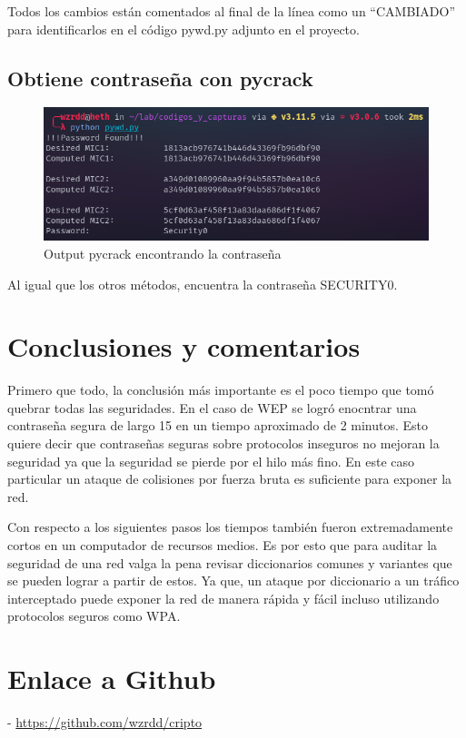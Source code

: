 \documentclass[letter,12pt]{article}
\begin{document}
Todos los cambios están comentados al final de la línea como un ``CAMBIADO'' para identificarlos en el código pywd.py adjunto en el proyecto.

\subsection{Obtiene contraseña con pycrack}

\begin{figure}[H]
  \centering
  \includegraphics[width=16cm]{images/11-pycrack-founded.png}
  \caption{Output pycrack encontrando la contraseña}
\end{figure}

Al igual que los otros métodos, encuentra la contraseña SECURITY0.

\section*{Conclusiones y comentarios}
Primero que todo, la conclusión más importante es el poco tiempo que tomó quebrar todas las seguridades. En el caso de WEP se logró enocntrar una contraseña segura de largo 15 en un tiempo aproximado de 2 minutos. Esto quiere decir que contraseñas seguras sobre protocolos inseguros no mejoran la seguridad ya que la seguridad se pierde por el hilo más fino. En este caso particular un ataque de colisiones por fuerza bruta es suficiente para exponer la red.

Con respecto a los siguientes pasos los tiempos también fueron extremadamente cortos en un computador de recursos medios. Es por esto que para auditar la seguridad de una red valga la pena revisar diccionarios comunes y variantes que se pueden lograr a partir de estos. Ya que, un ataque por diccionario a un tráfico interceptado puede exponer la red de manera rápida y fácil incluso utilizando protocolos seguros como WPA.

\section*{Enlace a Github}
- \url{https://github.com/wzrdd/cripto}
\end{document}
